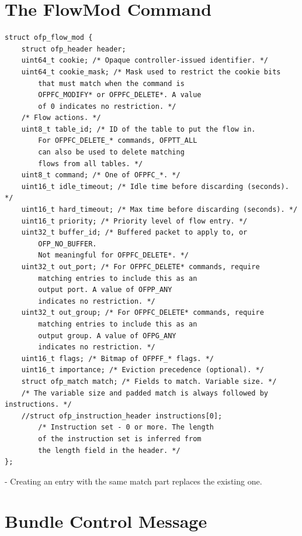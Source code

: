 \documentclass[conference]{sigcomm-alternate}
\begin{document}
\begin{appendix}

\section{The FlowMod Command}

\begin{lstlisting}
struct ofp_flow_mod {
	struct ofp_header header;
	uint64_t cookie; /* Opaque controller-issued identifier. */
	uint64_t cookie_mask; /* Mask used to restrict the cookie bits
		that must match when the command is
		OFPFC_MODIFY* or OFPFC_DELETE*. A value
		of 0 indicates no restriction. */
	/* Flow actions. */
	uint8_t table_id; /* ID of the table to put the flow in.
		For OFPFC_DELETE_* commands, OFPTT_ALL
		can also be used to delete matching
		flows from all tables. */
	uint8_t command; /* One of OFPFC_*. */
	uint16_t idle_timeout; /* Idle time before discarding (seconds). */
	uint16_t hard_timeout; /* Max time before discarding (seconds). */
	uint16_t priority; /* Priority level of flow entry. */
	uint32_t buffer_id; /* Buffered packet to apply to, or
		OFP_NO_BUFFER.
		Not meaningful for OFPFC_DELETE*. */
	uint32_t out_port; /* For OFPFC_DELETE* commands, require
		matching entries to include this as an
		output port. A value of OFPP_ANY
		indicates no restriction. */
	uint32_t out_group; /* For OFPFC_DELETE* commands, require
		matching entries to include this as an
		output group. A value of OFPG_ANY
		indicates no restriction. */
	uint16_t flags; /* Bitmap of OFPFF_* flags. */
	uint16_t importance; /* Eviction precedence (optional). */
	struct ofp_match match; /* Fields to match. Variable size. */
	/* The variable size and padded match is always followed by instructions. */
	//struct ofp_instruction_header instructions[0];
		/* Instruction set - 0 or more. The length
		of the instruction set is inferred from
		the length field in the header. */
};
\end{lstlisting}


- Creating an entry with the same match part replaces the existing one.

\section{Bundle Control Message}


\end{appendix}
\end{document}
